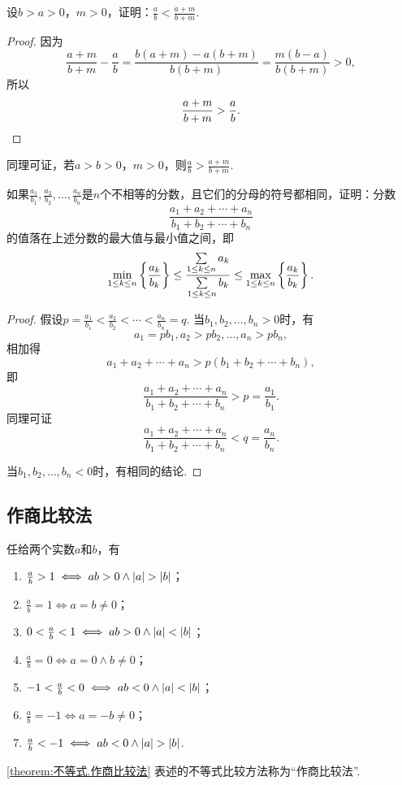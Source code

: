 \begin{example}\label{example:不等式.真分数的分子分母同加一个正数}
设\(b > a > 0\)，\(m > 0\)，证明：\(\frac{a}{b} < \frac{a+m}{b+m}\).
\begin{proof}
因为\[
\frac{a+m}{b+m} - \frac{a}{b}
= \frac{b(a+m) - a(b+m)}{b(b+m)}
= \frac{m(b-a)}{b(b+m)} > 0,
\]所以\[
\frac{a+m}{b+m} > \frac{a}{b}.
\qedhere
\]
\end{proof}
\end{example}
同理可证，若\(a > b > 0\)，\(m > 0\)，则\(\frac{a}{b} > \frac{a+m}{b+m}\).

\begin{example}\label{example:不等式.不同浓度的溶液的混合}
如果\(\frac{a_1}{b_1},\frac{a_2}{b_2},\dotsc,\frac{a_n}{b_n}\)是\(n\)个不相等的分数，且它们的分母的符号都相同，证明：分数\[
\frac{a_1+a_2+\dotsb+a_n}{b_1+b_2+\dotsb+b_n}
\]的值落在上述分数的最大值与最小值之间，即
\begin{equation}
\def\lu{\limits_{1 \leq k \leq n}}%
\min\lu\left\{ \frac{a_k}{b_k} \right\}
\leq
\frac{\sum\lu a_k}{\sum\lu b_k}
\leq
\max\lu\left\{ \frac{a_k}{b_k} \right\}.
\end{equation}
\begin{proof}
假设\(p=\frac{a_1}{b_1}<\frac{a_2}{b_2}<\dotsb<\frac{a_n}{b_n}=q\).
当\(b_1,b_2,\dotsc,b_n>0\)时，有\[
a_1 = p b_1,
a_2 > p b_2,
\dotsc,
a_n > p b_n,
\]相加得\[
a_1 + a_2 + \dotsb + a_n > p(b_1 + b_2 + \dotsb + b_n),
\]即\[
\frac{a_1+a_2+\dotsb+a_n}{b_1+b_2+\dotsb+b_n} > p = \frac{a_1}{b_1}.
\]同理可证\[
\frac{a_1+a_2+\dotsb+a_n}{b_1+b_2+\dotsb+b_n} < q = \frac{a_n}{b_n}.
\]

当\(b_1,b_2,\dotsc,b_n<0\)时，有相同的结论.
\end{proof}
\end{example}

\subsection{作商比较法}
\begin{theorem}\label{theorem:不等式.作商比较法}
任给两个实数\(a\)和\(b\)，有\begin{enumerate}
\item \(\frac{a}{b} > 1 \iff ab > 0 \land \abs{a} > \abs{b}\)；
\item \(\frac{a}{b} = 1 \iff a = b \neq 0\)；
\item \(0 < \frac{a}{b} < 1 \iff ab > 0 \land \abs{a} < \abs{b}\)；
\item \(\frac{a}{b} = 0 \iff a = 0 \land b \neq 0\)；
\item \(-1 < \frac{a}{b} < 0 \iff ab < 0 \land \abs{a} < \abs{b}\)；
\item \(\frac{a}{b} = -1 \iff a = -b \neq 0\)；
\item \(\frac{a}{b} < -1 \iff ab < 0 \land \abs{a} > \abs{b}\).
\end{enumerate}
\end{theorem}
\cref{theorem:不等式.作商比较法} 表述的不等式比较方法称为“作商比较法”.

